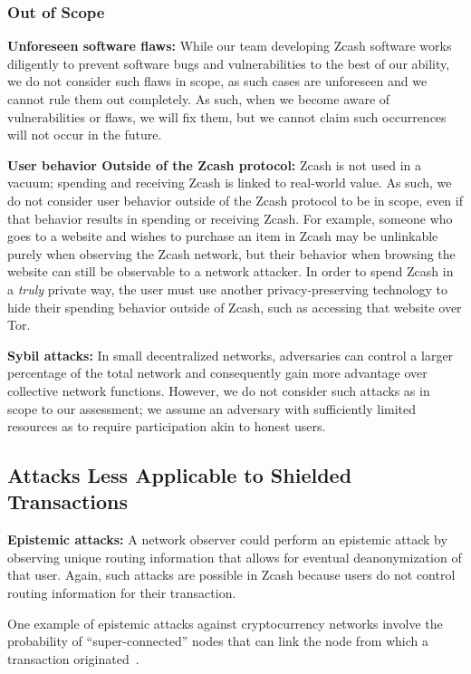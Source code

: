 \documentclass{article}
\begin{document}
\subsubsection{Out of Scope}
\label{out-of-scope}

\textbf{Unforeseen software flaws:} While our team developing Zcash software
works diligently to prevent software bugs and vulnerabilities to the best of
our ability, we do not
consider such flaws in scope, as such cases are unforeseen
and we cannot rule them out completely. As such, when we become aware of
vulnerabilities or flaws, we will fix them, but we cannot claim such
occurrences will not occur in the future.

\textbf{User behavior Outside of the Zcash protocol:} Zcash is not used in a
vacuum; spending and receiving Zcash is linked to real-world value. As such, we
do not consider user behavior outside of the Zcash protocol to be in scope,
even if that behavior results in spending or receiving Zcash.
For example, someone who goes to a website and wishes to purchase an item in
Zcash may be unlinkable purely when observing the Zcash network, but their
behavior when browsing the website can still be observable to a network
attacker. In order to spend Zcash in a \emph{truly} private way, the user must
use another privacy-preserving technology to hide their spending behavior
outside of Zcash, such as accessing that website over Tor.

\textbf{Sybil attacks:} In small decentralized networks, adversaries can
control a larger percentage of the total network and consequently gain more
advantage over collective network functions. However, we do not consider such
attacks as in scope to our assessment; we assume an adversary with sufficiently
limited resources as to require participation akin to honest users.

\subsection{Attacks Less Applicable to Shielded Transactions}

\textbf{Epistemic attacks:} A network observer could perform an epistemic
attack by observing unique routing information that allows for eventual
deanonymization of that user. Again, such attacks are possible in Zcash because
users do not control routing information for their transaction.

One example of epistemic attacks against cryptocurrency networks involve the
probability of ``super-connected'' nodes that can link the node from which a
transaction originated~\cite{dandelion, fanti2018dandelion}.
\end{document}
